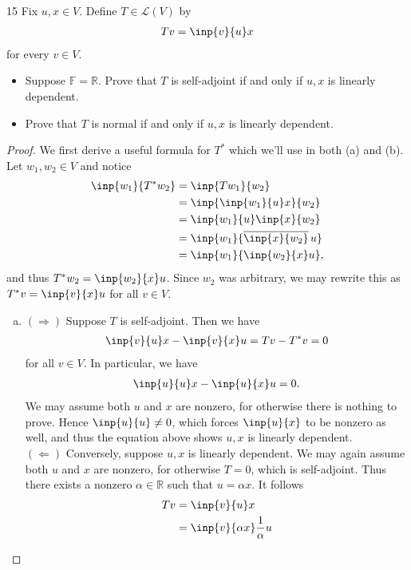 \documentclass{extarticle}
\newenvironment{problem}[1]{\begin{prob*}{#1}{}}{\end{prob*}}
\newcommand{\R}{\mathbb{R}}
\newcommand{\F}{\mathbb{F}}
\newcommand{\Hom}{\mathcal{L}}
\newcommand\widebar[1]{\mathop{\overline{#1}}}
\begin{document}
\begin{problem}{15}
Fix $u,x\in V$.  Define $T\in\Hom(V)$ by
\begin{align*}
Tv = \inp{v}{u}x
\end{align*}
for every $v\in V$.
\begin{itemize}[(a)]
\item Suppose $\F = \R$.  Prove that $T$ is self-adjoint if and only if $u,x$ is linearly dependent.
\item Prove that $T$ is normal if and only if $u,x$ is linearly dependent.
\end{itemize}
\end{problem}
\begin{proof}
We first derive a useful formula for $T^\ast$ which we'll use in both (a) and (b).  Let $w_1,w_2\in V$ and notice
\begin{align*}
\inp{w_1}{T^\ast w_2} &= \inp{Tw_1}{w_2}\\
&= \inp{\inp{w_1}{u}x}{w_2}\\
&= \inp{w_1}{u}\inp{x}{w_2}\\
&= \inp{w_1}{\widebar{\inp{x}{w_2}}u}\\
&= \inp{w_1}{\inp{w_2}{x}u},
\end{align*}
and thus $T^\ast w_2 = \inp{w_2}{x}u$.  Since $w_2$ was arbitrary, we may rewrite this as $T^\ast v = \inp{v}{x}u$ for all $v\in V$.
\begin{enumerate}[(a), listparindent=1.5em]
\item $(\Rightarrow)$ Suppose $T$ is self-adjoint.  Then we have
\begin{align*}
\inp{v}{u}x - \inp{v}{x}u = Tv - T^\ast v = 0
\end{align*}
for all $v\in V$.  In particular, we have
\begin{align*}
\inp{u}{u}x - \inp{u}{x}u = 0.
\end{align*}
We may assume both $u$ and $x$ are nonzero, for otherwise there is nothing to prove.  Hence $\inp{u}{u}\neq 0$, which forces $\inp{u}{x}$ to be nonzero as well, and thus the equation above shows $u,x$ is linearly dependent.\\
\indent $(\Leftarrow)$ Conversely, suppose $u,x$ is linearly dependent.  We may again assume both $u$ and $x$ are nonzero, for otherwise $T=0$, which is self-adjoint.  Thus there exists a nonzero $\alpha\in\R$ such that $u = \alpha x$.  It follows
\begin{align*}
Tv &= \inp{v}{u}x\\
&= \inp{v}{\alpha x}\frac{1}{\alpha} u\\

\end{align*}
\end{enumerate}
\end{proof}
\end{document}

